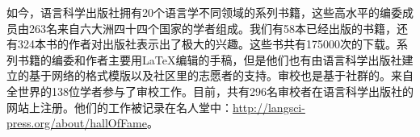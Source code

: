 
如今，语言科学出版社拥有20个语言学不同领域的系列书籍，这些高水平的编委成员由263名来自六大洲四十四个国家的学者组成。我们有58本已经出版的书籍，还有324本书的作者对出版社表示出了极大的兴趣。这些书共有175000次的下载。系列书籍的编委和作者主要用\LaTeX{}编辑的手稿，但是他们也有由语言科学出版社建立的基于网络的格式模版以及社区里的志愿者的支持。审校也是基于社群的。来自全世界的138位学者参与了审校工作。目前，共有296名审校者在语言科学出版社的网站上注册。他们的工作被记录在名人堂中：\url{http://langsci-press.org/about/hallOfFame}。

